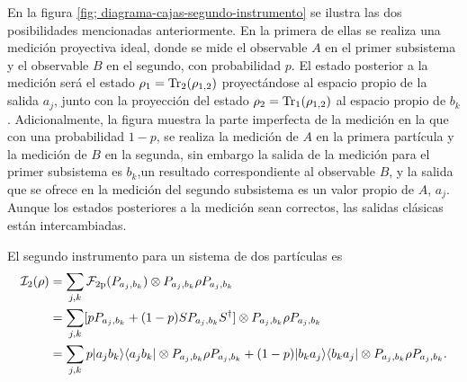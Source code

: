 En la figura {\ref{fig; diagrama-cajas-segundo-instrumento}} se ilustra las dos posibilidades mencionadas anteriormente. En la primera de ellas se realiza una medición proyectiva ideal, donde se mide el observable $A$ en el primer subsistema y el observable $B$ en el segundo, con probabilidad $p$. El estado posterior a la medición será el estado $\rho_1={\rm Tr}_2(\rho_{1,2})$ proyectándose al espacio propio de la salida $a_j$, junto con la proyección del estado $\rho_2={\rm Tr}_1(\rho_{1,2})$ al espacio propio de $b_k$. Adicionalmente, la figura muestra la parte imperfecta de la medición en la que con una probabilidad $1-p$, se realiza la medición de $A$ en la primera partícula y la medición de $B$ en la segunda, sin embargo la salida de la medición para el primer subsistema es $b_k$,un resultado correspondiente al observable $B$, y la salida que se ofrece en la medición del segundo subsistema es un valor propio de $A$, $a_j$. Aunque los estados posteriores a la medición sean correctos, las salidas clásicas están intercambiadas.





El segundo instrumento para un sistema de dos partículas es \begin{equation}\label{eq:second-instrument-2p}
    \begin{split}
        \mathcal{I}_2(\rho)&=\sum_{j,k}\mathcal{F}_{2\text{p}}(P_{a_j,b_k})\otimes P_{a_j,b_k} \rho P_{a_j,b_k}\\
        &=\sum_{j,k}[pP_{a_j,b_k}+(1-p)SP_{a_j,b_k}S^\dagger]\otimes P_{a_j,b_k} \rho P_{a_j,b_k}\\
        &=\sum_{j,k} p |a_j b_k\rangle \langle a_j b_k| \otimes P_{a_j,b_k} \rho P_{a_j,b_k}+(1-p)|b_k a_j\rangle \langle b_k a_j|\otimes P_{a_j,b_k} \rho P_{a_j,b_k}.\\
    \end{split}
\end{equation} 




